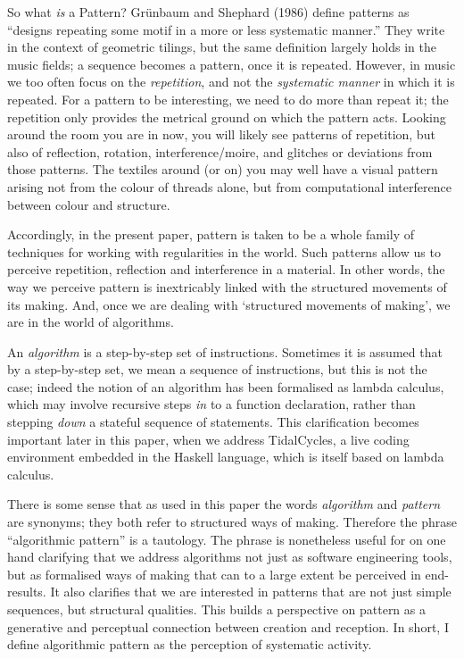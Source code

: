\documentclass{nime-alternate} %
\begin{document}
So what \emph{is} a Pattern? Grünbaum and Shephard (1986) define
patterns as ``designs repeating some motif in a more or less systematic
manner.'' They write in the context of geometric tilings, but the same
definition largely holds in the music fields; a sequence becomes a
pattern, once it is repeated. However, in music we too often focus on
the \emph{repetition}, and not the \emph{systematic manner} in which it
is repeated. For a pattern to be interesting, we need to do more than
repeat it; the repetition only provides the metrical ground on which the
pattern acts. Looking around the room you are in now, you will likely
see patterns of repetition, but also of reflection, rotation,
interference/moire, and glitches or deviations from those patterns. The
textiles around (or on) you may well have a visual pattern arising not
from the colour of threads alone, but from computational interference
between colour and structure.

Accordingly, in the present paper, pattern is taken to be a whole family
of techniques for working with regularities in the world. Such patterns
allow us to perceive repetition, reflection and interference in a
material. In other words, the way we perceive pattern is inextricably
linked with the structured movements of its making. And, once we are
dealing with `structured movements of making', we are in the world of
algorithms.

An \emph{algorithm} is a step-by-step set of instructions. Sometimes it
is assumed that by a step-by-step set, we mean a sequence of
instructions, but this is not the case; indeed the notion of an
algorithm has been formalised as lambda calculus, which may involve
recursive steps \emph{in} to a function declaration, rather than
stepping \emph{down} a stateful sequence of statements. This
clarification becomes important later in this paper, when we address
TidalCycles, a live coding environment embedded in the Haskell language,
which is itself based on lambda calculus.

There is some sense that as used in this paper the words
\emph{algorithm} and \emph{pattern} are synonyms; they both refer to
structured ways of making. Therefore the phrase ``algorithmic pattern''
is a tautology. The phrase is nonetheless useful for on one hand
clarifying that we address algorithms not just as software engineering
tools, but as formalised ways of making that can to a large extent be
perceived in end-results. It also clarifies that we are interested in
patterns that are not just simple sequences, but structural qualities.
This builds a perspective on pattern as a generative and perceptual
connection between creation and reception. In short, I define
algorithmic pattern as the perception of systematic activity.
\end{document}
